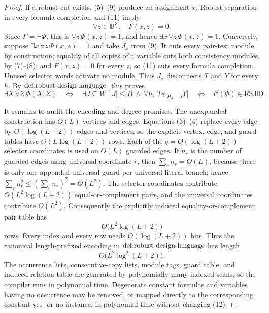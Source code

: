 \documentclass{article}
\begin{document}
\begin{proof}
If a robust cut exists, (5)--(9) produce an assignment \(x\).  Robust separation in every formula completion and (11) imply
\[
\forall z\in\mathbb B^Z,\quad F(x,z)=0.
\]
Since \(F=\neg\Phi\), this is \(\forall z\,\Phi(x,z)=1\), and hence \(\exists x\,\forall z\,\Phi(x,z)=1\).  Conversely, suppose \(\exists x\,\forall z\,\Phi(x,z)=1\) and take \(J_x\) from (9).  It cuts every pair-test module by construction; equality of all copies of a variable cuts both consistency modules by (7)--(8); and \(F(x,z)=0\) for every \(z\), so (11) cuts every formula completion.  Unused selector words activate no module.  Thus \(J_x\) disconnects \(T\) and \(Y\) for every \(h\).  By \(\textnormal{def:robust-design-language}\), this proves
\[
\exists X\,\forall Z\,\Phi(X,Z)
\quad\Longleftrightarrow\quad
\exists J\subseteq W\ \bigl[|J|\le B\ \wedge\ \forall h,\ T\not\sim_{H_h-J}Y\bigr]
\quad\Longleftrightarrow\quad
\mathcal C(\Phi)\in\mathsf{RSJID}. \tag{12}
\]

It remains to audit the encoding and degree promises.  The unexpanded construction has \(O(L)\) vertices and edges.  Equations (3)--(4) replace every edge by \(O(\log(L+2))\) edges and vertices, so the explicit vertex, edge, and guard tables have \(O(L\log(L+2))\) rows.  Each of the \(q=O(\log(L+2))\) selector coordinates is used on \(O(L)\) guarded edges.  If \(n_r\) is the number of guarded edges using universal coordinate \(r\), then \(\sum_r n_r=O(L)\), because there is only one appended universal guard per universal-literal branch; hence \(\sum_r n_r^2\le(\sum_r n_r)^2=O(L^2)\).  The selector coordinates contribute \(O(L^2\log(L+2))\) equal-or-complement pairs, and the universal coordinates contribute \(O(L^2)\).  Consequently the explicitly induced equality-or-complement pair table has
\[
O\bigl(L^2\log(L+2)\bigr) \tag{13}
\]
rows.  Every index and every row needs \(O(\log(L+2))\) bits.  Thus the canonical length-prefixed encoding in \(\textnormal{def:robust-design-language}\) has length
\[
O\bigl(L^2\log^2(L+2)\bigr). \tag{14}
\]
The occurrence lists, consecutive-copy lists, module tags, guard table, and induced relation table are generated by polynomially many indexed scans, so the compiler runs in polynomial time.  Degenerate constant formulas and variables having no occurrence may be removed, or mapped directly to the corresponding constant yes- or no-instance, in polynomial time without changing (12).


\end{proof}
\end{document}
